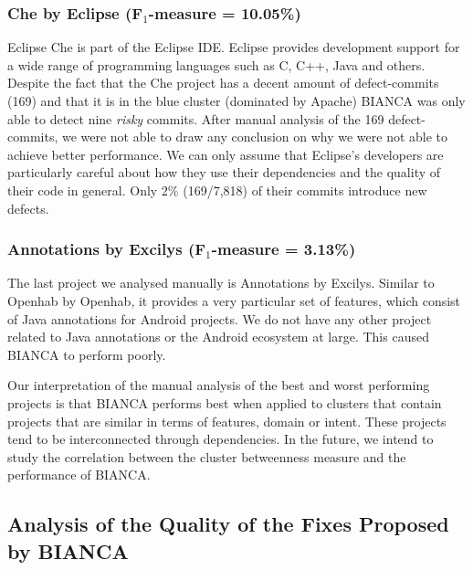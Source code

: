 \documentclass[12pt]{report}
\begin{document}
\subsubsection{\texorpdfstring{Che by Eclipse (F\(_1\)-measure =
10.05\%)}{Che by Eclipse (F\_1-measure = 10.05\%)}}\label{che-by-eclipse-fux5f1-measure-10.05}

Eclipse Che is part of the Eclipse IDE. Eclipse provides development
support for a wide range of programming languages such as C, C++, Java
and others. Despite the fact that the Che project has a decent amount of
defect-commits (169) and that it is in the blue cluster (dominated by
Apache) BIANCA was only able to detect nine \emph{risky} commits. After
manual analysis of the 169 defect-commits, we were not able to draw any
conclusion on why we were not able to achieve better performance. We can
only assume that Eclipse's developers are particularly careful about how
they use their dependencies and the quality of their code in general.
Only 2\% (169/7,818) of their commits introduce new defects.

\subsubsection{\texorpdfstring{Annotations by Excilys (F\(_1\)-measure =
3.13\%)}{Annotations by Excilys (F\_1-measure = 3.13\%)}}\label{annotations-by-excilys-fux5f1-measure-3.13}

The last project we analysed manually is Annotations by Excilys. Similar
to Openhab by Openhab, it provides a very particular set of features,
which consist of Java annotations for Android projects. We do not have
any other project related to Java annotations or the Android ecosystem
at large. This caused BIANCA to perform poorly.

Our interpretation of the manual analysis of the best and worst
performing projects is that BIANCA performs best when applied to
clusters that contain projects that are similar in terms of features,
domain or intent. These projects tend to be interconnected through
dependencies. In the future, we intend to study the correlation between
the cluster betweenness measure and the performance of BIANCA.

\subsection{Analysis of the Quality of the Fixes Proposed by
BIANCA}\label{analysis-of-the-quality-of-the-fixes-proposed-by-bianca}
\end{document}
